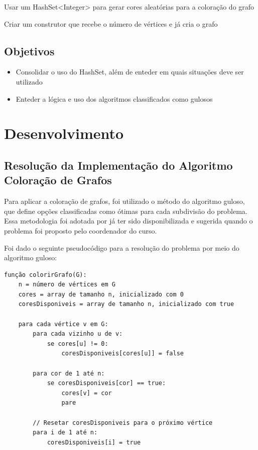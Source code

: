 \documentclass[
	12pt,				%
	oneside,			%
	a4paper,			%
	english,			%
	brazil,				%
	]{abntex2}
\begin{document}
{Usar um HashSet<Integer> para gerar cores aleatórias para a coloração do grafo

Criar um construtor que recebe o número de vértices e já cria o grafo
\subsection{Objetivos}

\begin{itemize}
    \item Consolidar o uso do HashSet, além de enteder em quais situações deve ser utilizado

    \item Enteder a lógica e uso dos algoritmos classificados como gulosos
\end{itemize}

\section{Desenvolvimento}

\subsection{Resolução da Implementação do Algoritmo Coloração de Grafos}

Para aplicar a coloração de grafos, foi utilizado o método do algoritmo guloso, que define opções classificadas como ótimas para cada subdivisão do problema. Essa metodologia foi adotada por já ter sido disponibilizada e sugerida quando o problema foi proposto pelo coordenador do curso.

Foi dado o seguinte pseudocódigo para a resolução do problema por meio do algoritmo guloso:

\begin{verbatim}
função colorirGrafo(G):
    n = número de vértices em G
    cores = array de tamanho n, inicializado com 0
    coresDisponiveis = array de tamanho n, inicializado com true

    para cada vértice v em G:
        para cada vizinho u de v:
            se cores[u] != 0:
                coresDisponiveis[cores[u]] = false

        para cor de 1 até n:
            se coresDisponiveis[cor] == true:
                cores[v] = cor
                pare

        // Resetar coresDisponiveis para o próximo vértice
        para i de 1 até n:
            coresDisponiveis[i] = true


\end{verbatim}}
\end{document}
